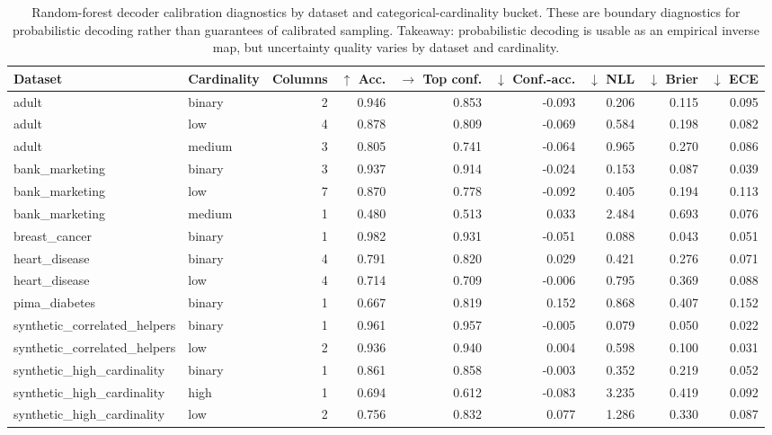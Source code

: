\begin{table}
\caption{Random-forest decoder calibration diagnostics by dataset and categorical-cardinality bucket. These are boundary diagnostics for probabilistic decoding rather than guarantees of calibrated sampling. Takeaway: probabilistic decoding is usable as an empirical inverse map, but uncertainty quality varies by dataset and cardinality.}
\label{tab:decoder-calibration}
\begin{adjustbox}{max width=\textwidth}
\begin{tabular}{llrrrrrrr}
\toprule
Dataset & Cardinality & Columns & $\uparrow$ Acc. & $\rightarrow$ Top conf. & $\downarrow$ Conf.-acc. & $\downarrow$ NLL & $\downarrow$ Brier & $\downarrow$ ECE \\
\midrule
adult & binary & 2 & 0.946 & 0.853 & -0.093 & 0.206 & 0.115 & 0.095 \\
adult & low & 4 & 0.878 & 0.809 & -0.069 & 0.584 & 0.198 & 0.082 \\
adult & medium & 3 & 0.805 & 0.741 & -0.064 & 0.965 & 0.270 & 0.086 \\
bank\_marketing & binary & 3 & 0.937 & 0.914 & -0.024 & 0.153 & 0.087 & 0.039 \\
bank\_marketing & low & 7 & 0.870 & 0.778 & -0.092 & 0.405 & 0.194 & 0.113 \\
bank\_marketing & medium & 1 & 0.480 & 0.513 & 0.033 & 2.484 & 0.693 & 0.076 \\
breast\_cancer & binary & 1 & 0.982 & 0.931 & -0.051 & 0.088 & 0.043 & 0.051 \\
heart\_disease & binary & 4 & 0.791 & 0.820 & 0.029 & 0.421 & 0.276 & 0.071 \\
heart\_disease & low & 4 & 0.714 & 0.709 & -0.006 & 0.795 & 0.369 & 0.088 \\
pima\_diabetes & binary & 1 & 0.667 & 0.819 & 0.152 & 0.868 & 0.407 & 0.152 \\
synthetic\_correlated\_helpers & binary & 1 & 0.961 & 0.957 & -0.005 & 0.079 & 0.050 & 0.022 \\
synthetic\_correlated\_helpers & low & 2 & 0.936 & 0.940 & 0.004 & 0.598 & 0.100 & 0.031 \\
synthetic\_high\_cardinality & binary & 1 & 0.861 & 0.858 & -0.003 & 0.352 & 0.219 & 0.052 \\
synthetic\_high\_cardinality & high & 1 & 0.694 & 0.612 & -0.083 & 3.235 & 0.419 & 0.092 \\
synthetic\_high\_cardinality & low & 2 & 0.756 & 0.832 & 0.077 & 1.286 & 0.330 & 0.087 \\

\end{tabular}
\end{adjustbox}
\end{table}
